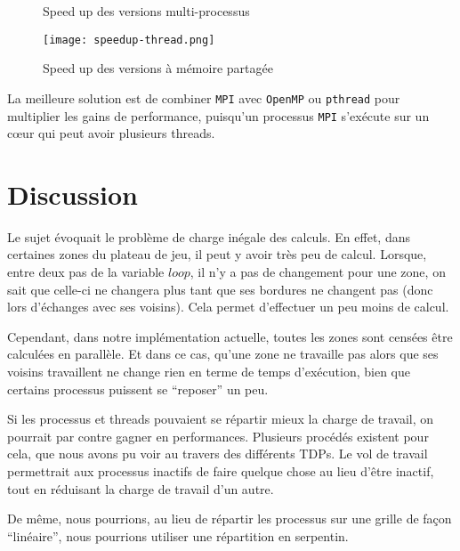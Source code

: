 \begin{figure}[H]
\centering
\caption{Speed up des versions multi-processus}
\label{fig:sp-proc}
\end{figure}

\begin{figure}[h!]
\centering
\texttt{[image: speedup-thread.png]}
\caption{Speed up des versions à mémoire partagée}
\label{fig:sp-thread}
\end{figure}

La meilleure solution est de combiner \texttt{MPI} avec \texttt{OpenMP} ou \texttt{pthread} pour multiplier les gains de performance, puisqu'un processus \texttt{MPI} s'exécute sur un c\oe ur qui peut avoir plusieurs threads.


\section{Discussion} %
\label{sec:discussion}

Le sujet évoquait le problème de charge inégale des calculs. En effet, dans certaines zones du plateau de jeu, il peut y avoir très peu de calcul. Lorsque, entre deux pas de la variable $loop$, il n'y a pas de changement pour une zone, on sait que celle-ci ne changera plus tant que ses bordures ne changent pas (donc lors d'échanges avec ses voisins). Cela permet d'effectuer un peu moins de calcul.

Cependant, dans notre implémentation actuelle, toutes les zones sont censées être calculées en parallèle. Et dans ce cas, qu'une zone ne travaille pas alors que ses voisins travaillent ne change rien en terme de temps d'exécution, bien que certains processus puissent se ``reposer'' un peu. 

Si les processus et threads pouvaient se répartir mieux la charge de travail, on pourrait par contre gagner en performances. Plusieurs procédés existent pour cela, que nous avons pu voir au travers des différents TDPs. Le vol de travail permettrait aux processus inactifs de faire quelque chose au lieu d'être inactif, tout en réduisant la charge de travail d'un autre. 

De même, nous pourrions, au lieu de répartir les processus sur une grille de façon ``linéaire'', nous pourrions utiliser une répartition en serpentin. 
